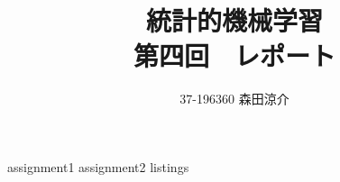 \documentclass[dvipdfmx, fleqn, titlepage]{jsarticle}
\title{
	統計的機械学習 \\
	第四回　レポート
	}
\author{37-196360 \quad 森田涼介}
\begin{document}
\maketitle
{assignment1}
\clearpage
{assignment2}
\clearpage
{listings}
\end{document}
